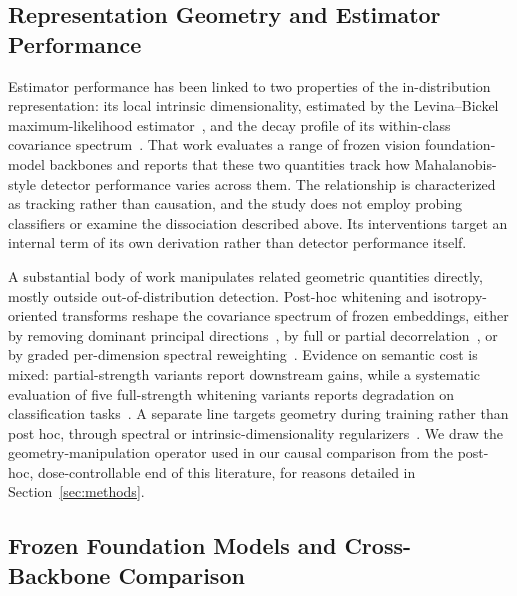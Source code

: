 \subsection{Representation Geometry and Estimator Performance}

Estimator performance has been linked to two properties of the
in-distribution representation: its local intrinsic dimensionality, estimated
by the Levina--Bickel maximum-likelihood estimator~\cite{levina2004maximum},
and the decay profile of its within-class covariance
spectrum~\cite{yu2510dissecting}. That work evaluates a range of frozen
vision foundation-model backbones and reports that these two quantities track
how Mahalanobis-style detector performance varies across them. The
relationship is characterized as tracking rather than causation, and the
study does not employ probing classifiers or examine the dissociation
described above. Its interventions target an internal term of its own
derivation rather than detector performance itself.

A substantial body of work manipulates related geometric quantities directly,
mostly outside out-of-distribution detection. Post-hoc whitening and
isotropy-oriented transforms reshape the covariance spectrum of frozen
embeddings, either by removing dominant principal
directions~\cite{mu2018allbutthetop}, by full or partial
decorrelation~\cite{su2021whitening,diera2024isotropy}, or by graded
per-dimension spectral reweighting~\cite{li2603spectral}. Evidence on
semantic cost is mixed: partial-strength variants report downstream gains,
while a systematic evaluation of five full-strength whitening variants
reports degradation on classification tasks~\cite{forooghi2024whitening}.
A separate line targets geometry during training rather than post
hoc, through spectral or intrinsic-dimensionality
regularizers~\cite{weng2023modulate,huang2024ldreg}. We draw the
geometry-manipulation operator used in our causal comparison from the
post-hoc, dose-controllable end of this literature, for reasons detailed in
Section~\ref{sec:methods}.

\subsection{Frozen Foundation Models and Cross-Backbone Comparison}

